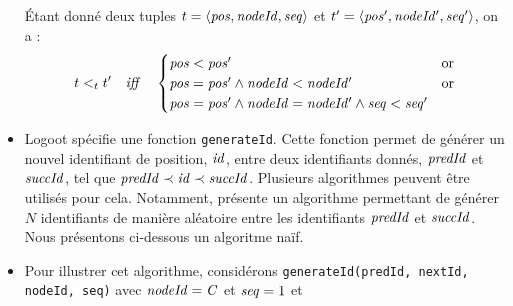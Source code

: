 \begin{itemize}
    \begin{definition}
      Étant donné deux tuples $t = \langle \mathit{pos},\mathit{nodeId},\mathit{seq} \rangle$ et $t' = \langle \mathit{pos'},\mathit{nodeId'},\mathit{seq'} \rangle$, on a :
        \[
          t <_{t} t' \quad \mathit{iff} \quad
          \begin{cases}
            \mathit{pos} < \mathit{pos}'                                            & \text{or} \\
            \mathit{pos} = \mathit{pos'} \land \mathit{nodeId} < \mathit{nodeId'}                    & \text{or} \\
            \mathit{pos} = \mathit{pos'} \land \mathit{nodeId} = \mathit{nodeId'} \land \mathit{seq} < \mathit{seq'}  &           \\
          \end{cases}
        \]
    \end{definition}
  \item Logoot spécifie une fonction \texttt{generateId}.
    Cette fonction permet de générer un nouvel identifiant de position, $\mathit{id}$, entre deux identifiants donnés, $\mathit{predId}$ et $\mathit{succId}$, tel que $\mathit{predId} \prec \mathit{id} \prec \mathit{succId}$.
    Plusieurs algorithmes peuvent être utilisés pour cela.
    Notamment, \cite{2009-logoot-weiss} présente un algorithme permettant de générer $N$ identifiants de manière aléatoire entre les identifiants $\mathit{predId}$ et $\mathit{succId}$.
    Nous présentons ci-dessous un algoritme naïf.
  \item Pour illustrer cet algorithme, considérons \texttt{generateId(predId, nextId, nodeId, seq)} avec  $\mathit{nodeId} = \mathit{C}$ et $\mathit{seq} = 1$ et

\end{itemize}
